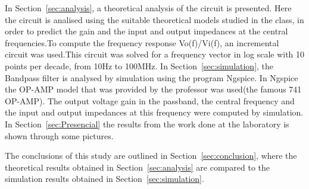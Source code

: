 In Section~\ref{sec:analysis}, a theoretical analysis of the circuit is
presented. Here the circuit is analised using the suitable theoretical models studied in the class, in order to predict the gain and the input and output impedances at the central frequencies.To compute the frequency response Vo(f)/Vi(f), an incremental circuit was used.This circuit was solved for a frequency vector in log scale with 10 points per decade, from 10Hz to 100MHz. 
In Section~\ref{sec:simulation}, the Bandpass filter is analysed by
simulation using the program Ngspice. In Ngspice the OP-AMP model that was provided by the professor was used(the famous 741 OP-AMP). The output voltage gain in the passband, the central frequency  and the input and output impedances at this frequency were computed by simulation. In Section~\ref{sec:Presencial} the results from the work done at the laboratory is shown through some pictures.

The conclusions of this study are outlined in
Section~\ref{sec:conclusion}, where the theoretical results obtained in
Section~\ref{sec:analysis} are compared to the simulation results obtained in
Section~\ref{sec:simulation}.





\pagebreak

